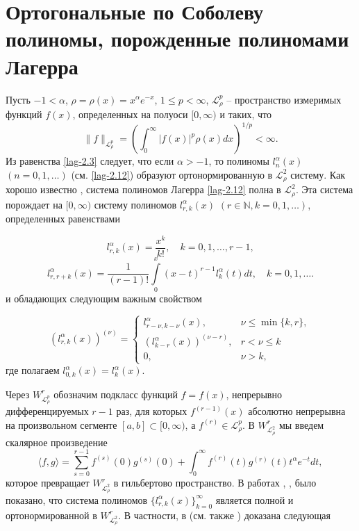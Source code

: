 \section{Ортогональные по Соболеву полиномы, порожденные полиномами Лагерра}
Пусть $-1<\alpha$,  $\rho=\rho(x)=x^\alpha e^{-x}$, $1\le p<\infty $,  $\mathcal{L}_{\rho}^p$ -- пространство измеримых функций $f(x)$, определенных на полуоси $[0,\infty)$ и таких, что
$$
\|f\|_{\mathcal{L}_{\rho}^p}=
\left(\int_0^\infty|f(x)|^p\rho(x)dx\right)^{1/p}<\infty.
$$
Из равенства \eqref{lag-2.3} следует, что если $\alpha>-1$, то полиномы $l_n^{\alpha}(x)$ $(n=0,1,\ldots)$ (см. \eqref{lag-2.12})
образуют ортонормированную в $\mathcal{L}_\rho^2$ систему. Как хорошо известно \cite{Sege}, система полиномов Лагерра  \eqref{lag-2.12} полна в $\mathcal{L}_\rho^2$.   Эта система порождает на $[0,\infty)$ систему полиномов $l_{r,k}^{\alpha}(x)$ $(r \in \mathbb{N}, k=0,1,\ldots)$, определенных равенствами

\begin{equation}\label{lag-3.1}
l_{r,k}^{\alpha}(x) =\frac{x^k}{k!}, \quad k=0,1,\ldots, r-1,
\end{equation}
\begin{equation}\label{lag-3.2}
l_{r,r+k}^{\alpha}(x) =\frac{1}{(r-1)!}\int\limits_{0}^x(x-t)^{r-1}l_{k}^{\alpha}(t)dt, \quad k=0,1,\ldots.
\end{equation}
и обладающих следующим важным свойством

\begin{equation}\label{lag-3.3}
(l^\alpha_{r,k}(x))^{(\nu)} =
\begin{cases}
l^\alpha_{r-\nu,k-\nu}(x), &\nu \le \min\{k,r\},\\
(l^\alpha_{k-r}(x))^{(\nu-r)}, &r<\nu \le k\\
0, &\nu>k,
\end{cases}
\end{equation}
где полагаем $l^\alpha_{0,k}(x)=l^\alpha_{k}(x)$.

Через $W_{\mathcal{L}_{\rho}^p}^r$ обозначим  подкласс функций $f=f(x)$,
непрерывно дифференцируемых $r-1$ раз, для которых $f^{(r-1)}(x)$
абсолютно непрерывна на произвольном сегменте $[a,b]\subset[0,\infty)$,
а $f^{(r)}\in \mathcal{L}_{\rho}^p$. В $W_{\mathcal{L}_{\rho}^2}^r$ мы введем скалярное произведение
\begin{equation}\label{lag-1.3}
\langle f,g \rangle=\sum_{s=0}^{r-1}f^{(s)}(0)g^{(s)}(0)+\int_0^\infty f^{(r)}(t)g^{(r)}(t)t^\alpha e^{-t}dt,
\end{equation}
которое превращает $W_{\mathcal{L}_{\rho}^2}^r$ в гильбертово пространство.
В работах \cite{SHII}, \cite{SharSMJ2017},  \cite{SharDiffur2018} было показано, что система полиномов $\{l_{r,k}^{\alpha}(x)\}_{k=0}^\infty$ является полной и ортонормированной в $W_{\mathcal{L}_{\rho}^2}^r$. В частности, в \cite{SHII} (см. также \cite{SharDiffur2018}) доказана следующая

